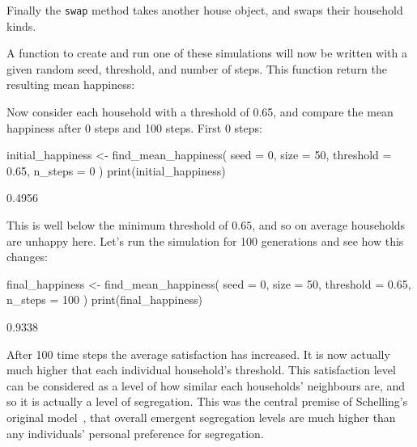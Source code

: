 Finally the \texttt{swap} method takes another house object, and
swaps their household kinds.

A function to create and run one of these simulations will now be written
with a given random seed, threshold, and number of steps. This function return
the resulting mean happiness:


Now consider each household with a threshold of
0.65, and compare the mean happiness after 0 steps and 100 steps.
First 0 steps:

\begin{Rin}
initial_happiness <- find_mean_happiness(
  seed = 0,
  size = 50,
  threshold = 0.65,
  n_steps = 0
)
print(initial_happiness)
\end{Rin}

\begin{Rout}
[1] 0.4956
\end{Rout}

This is well below the minimum threshold of \(0.65\), and so on average
households are unhappy here.
Let's run the simulation for 100 generations and see how this changes:

\begin{Rin}
final_happiness <- find_mean_happiness(
  seed = 0,
  size = 50,
  threshold = 0.65,
  n_steps = 100
)
print(final_happiness)
\end{Rin}

\begin{Rout}
[1] 0.9338
\end{Rout}

After 100 time steps the average satisfaction has increased.
It is now actually much higher that each individual household's threshold.
This satisfaction level can be considered as a level of how similar each
households' neighbours are, and so it is actually a level of segregation.
This was the central premise of Schelling's original
model~\cite{schelling2006micromotives}, that overall
emergent segregation levels are much higher than any individuals' personal
preference for segregation.

